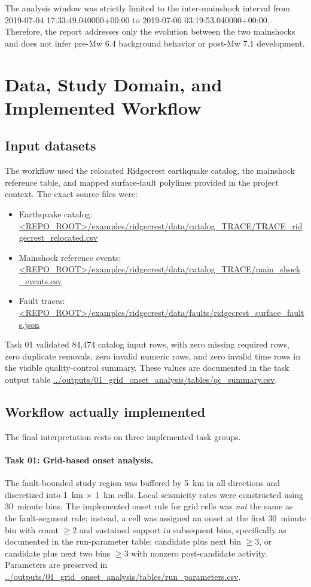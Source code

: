 \documentclass[11pt]{article}
\begin{document}
The analysis window was strictly limited to the inter-mainshock interval from 2019-07-04 17:33:49.040000+00:00 to 2019-07-06 03:19:53.040000+00:00. Therefore, the report addresses only the evolution between the two mainshocks and does not infer pre-Mw 6.4 background behavior or post-Mw 7.1 development.

\section{Data, Study Domain, and Implemented Workflow}
\subsection{Input datasets}
The workflow used the relocated Ridgecrest earthquake catalog, the mainshock reference table, and mapped surface-fault polylines provided in the project context. The exact source files were:
\begin{itemize}
    \item Earthquake catalog: \url{<REPO_ROOT>/examples/ridgecrest/data/catalog_TRACE/TRACE_ridgecrest_relocated.csv}
    \item Mainshock reference events: \url{<REPO_ROOT>/examples/ridgecrest/data/catalog_TRACE/main_shock_events.csv}
    \item Fault traces: \url{<REPO_ROOT>/examples/ridgecrest/data/faults/ridgecrest_surface_faults.json}
\end{itemize}

Task 01 validated 84,474 catalog input rows, with zero missing required rows, zero duplicate removals, zero invalid numeric rows, and zero invalid time rows in the visible quality-control summary. These values are documented in the task output table \url{../outputs/01_grid_onset_analysis/tables/qc_summary.csv}.

\subsection{Workflow actually implemented}
The final interpretation rests on three implemented task groups.

\paragraph{Task 01: Grid-based onset analysis.}
The fault-bounded study region was buffered by \SI{5}{km} in all directions and discretized into \SI{1}{km} \(\times\) \SI{1}{km} cells. Local seismicity rates were constructed using \SI{30}{minute} bins. The implemented onset rule for grid cells was \emph{not} the same as the fault-segment rule; instead, a cell was assigned an onset at the first \SI{30}{minute} bin with count \(\ge 2\) and sustained support in subsequent bins, specifically as documented in the run-parameter table: candidate plus next bin \(\ge 3\), or candidate plus next two bins \(\ge 3\) with nonzero post-candidate activity. Parameters are preserved in \url{../outputs/01_grid_onset_analysis/tables/run_parameters.csv}.
\end{document}
